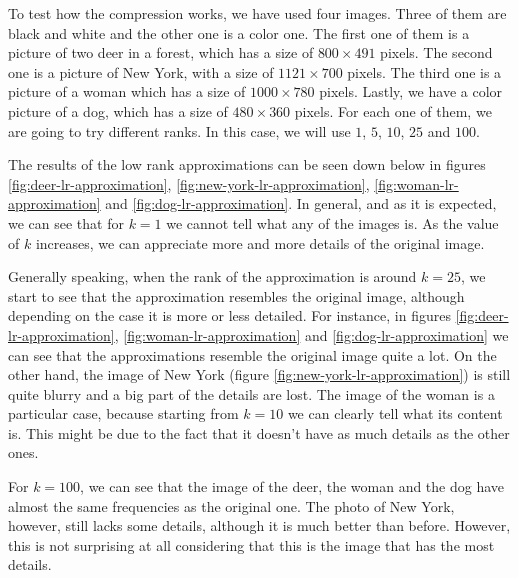 \documentclass[11pt,a4paper]{article}
\begin{document}
To test how the compression works, we have used four images. Three of them are black and white and the
other one is a color one. The first one of them is a picture of two deer in a forest, which has a size
of $800 \times 491$ pixels. The second one is a picture of New York, with a size of $1121 \times 700$ pixels.
The third one is a picture of a woman which has a size of $1000 \times 780$ pixels. Lastly, we have a color picture
of a dog, which has a size of $480 \times 360$ pixels. For each one of them, we are going to try different ranks.
In this case, we will use $1$, $5$, $10$, $25$ and $100$.

The results of the low rank approximations can be seen down below in figures \ref{fig:deer-lr-approximation},
\ref{fig:new-york-lr-approximation}, \ref{fig:woman-lr-approximation} and \ref{fig:dog-lr-approximation}.
In general, and as it is expected, we can see that for $k = 1$ we cannot tell what any of the images is.
As the value of $k$ increases, we can appreciate more and more details of the original image.

Generally speaking, when the rank of the approximation is around $k = 25$, we start to see that the
approximation resembles the original image, although depending on the case it is more or less detailed. For
instance, in figures \ref{fig:deer-lr-approximation}, \ref{fig:woman-lr-approximation} and
\ref{fig:dog-lr-approximation} we can see that the approximations resemble the original image quite a lot.
On the other hand, the image of New York (figure \ref{fig:new-york-lr-approximation}) is still
quite blurry and a big part of the details are lost. The image of the woman is a particular case,
because starting from $k = 10$ we can clearly tell what its content is. This might be due to the fact that it
doesn't have as much details as the other ones.

For $k = 100$, we can see that the image
of the deer, the woman and the dog have almost the same frequencies as the original one. The photo of New York,
however, still lacks some details, although it is much better than before. However, this is not surprising at
all considering that this is the image that has the most details.
\end{document}
